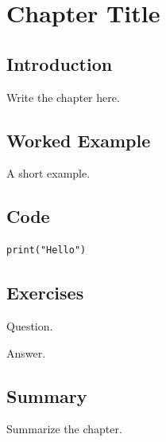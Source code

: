 
\chapter{Chapter Title}
\label{chap:replace-me}



\section{Introduction}

Write the chapter here.

\section{Worked Example}

\begin{example}A short example.\end{example}

\section{Code}
\begin{lstlisting}
print("Hello")
\end{lstlisting}

\section{Exercises}
\begin{exercise}Question.\end{exercise}
\begin{solution}Answer.\end{solution}

\section{Summary}

Summarize the chapter.
